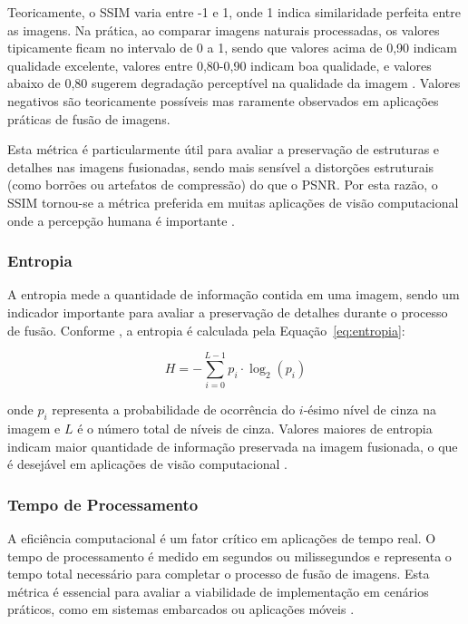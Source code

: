 Teoricamente, o SSIM varia entre -1 e 1, onde 1 indica similaridade perfeita entre as imagens. Na prática, ao comparar imagens naturais processadas, os valores tipicamente ficam no intervalo de 0 a 1, sendo que valores acima de 0,90 indicam qualidade excelente, valores entre 0,80-0,90 indicam boa qualidade, e valores abaixo de 0,80 sugerem degradação perceptível na qualidade da imagem \cite{wang2004image}. Valores negativos são teoricamente possíveis mas raramente observados em aplicações práticas de fusão de imagens.

Esta métrica é particularmente útil para avaliar a preservação de estruturas e detalhes nas imagens fusionadas, sendo mais sensível a distorções estruturais (como borrões ou artefatos de compressão) do que o PSNR. Por esta razão, o SSIM tornou-se a métrica preferida em muitas aplicações de visão computacional onde a percepção humana é importante \cite{wang2004image}.

\subsubsection{Entropia}

A entropia mede a quantidade de informação contida em uma imagem, sendo um indicador importante para avaliar a preservação de detalhes durante o processo de fusão. Conforme \cite{shannon1948mathematical}, a entropia é calculada pela Equação~\ref{eq:entropia}:

\begin{equation}
\label{eq:entropia}
H = -\sum_{i=0}^{L-1} p_i \cdot \log_2(p_i)
\end{equation}

\noindent onde $p_i$ representa a probabilidade de ocorrência do $i$-ésimo nível de cinza na imagem e $L$ é o número total de níveis de cinza. Valores maiores de entropia indicam maior quantidade de informação preservada na imagem fusionada, o que é desejável em aplicações de visão computacional \cite{qu2002information}.

\subsubsection{Tempo de Processamento}

A eficiência computacional é um fator crítico em aplicações de tempo real. O tempo de processamento é medido em segundos ou milissegundos e representa o tempo total necessário para completar o processo de fusão de imagens. Esta métrica é essencial para avaliar a viabilidade de implementação em cenários práticos, como em sistemas embarcados ou aplicações móveis \cite{brown2007automatic}.

